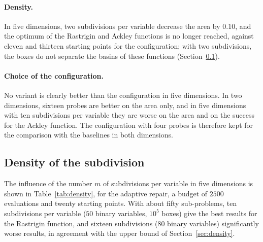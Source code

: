 \documentclass[pdflatex,sn-basic]{sn-jnl}
\begin{document}
\paragraph{Density.} In five dimensions, two subdivisions per variable decrease
the area by $0.10$, and the optimum of the Rastrigin and Ackley functions is no
longer reached, against eleven and thirteen starting points for the
configuration; with two subdivisions, the boxes do not separate the basins of
these functions (Section~\ref{sec:density-results}).

\paragraph{Choice of the configuration.} No variant is clearly better than the
configuration in five dimensions. In two dimensions, sixteen probes are better
on the area only, and in five dimensions with ten subdivisions per variable they
are worse on the area and on the success for the Ackley function. The
configuration with four probes is therefore kept for the comparison with the
baselines in both dimensions.

\subsection{Density of the subdivision}\label{sec:density-results}

The influence of the number $m$ of subdivisions per variable in five dimensions
is shown in Table~\ref{tab:density}, for the adaptive repair, a budget of $2500$
evaluations and twenty starting points. With about fifty sub-problems, ten
subdivisions per variable ($50$ binary variables, $10^5$ boxes) give the best
results for the Rastrigin function, and sixteen subdivisions ($80$ binary
variables) significantly worse results, in agreement with the upper bound of
Section~\ref{sec:density}.
\end{document}
